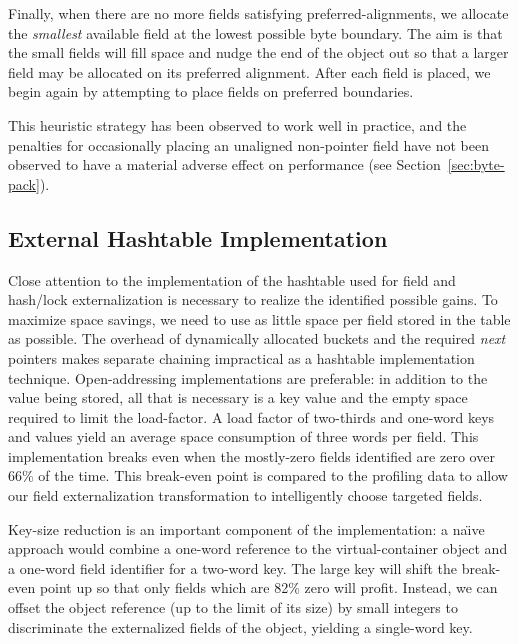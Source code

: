 \documentclass{acmconf}
\begin{document}
Finally, when there are no more fields satisfying
preferred-alignments, we
allocate the {\it smallest} available field at the lowest possible
byte boundary.
The aim is that the small fields will fill space and nudge
the end of the object out so that a larger field may be allocated on
its preferred alignment.  After each field is placed, we begin again
by attempting to place fields on preferred boundaries.

This heuristic strategy has been observed to work well in practice,
and the penalties for occasionally placing an unaligned non-pointer
field have not
been observed to have a material adverse effect on performance (see
Section~\ref{sec:byte-pack}). 



\subsection{External Hashtable Implementation}
\label{sec:extern-impl}

Close attention to the implementation of the hashtable used for
field and hash/lock externalization is
necessary to realize the identified possible gains.  To
maximize space savings, we need to use as little space
per field stored in the table as possible.  The overhead of
dynamically allocated buckets and the required {\it next} pointers
makes separate chaining impractical as a hashtable implementation technique.
Open-addressing
implementations are preferable: in addition to the value being stored,
all that is necessary is a key value and the empty space required to
limit the load-factor.  A load factor of two-thirds and one-word keys
and values yield an average space consumption of three words per
field.  This implementation breaks even when the mostly-zero fields
identified are zero over 66\% of the time.  This break-even point is
compared to the profiling data to allow our field externalization
transformation to intelligently choose targeted fields.

Key-size reduction is an important component of the implementation:
a na{\"\i}ve approach
would combine a one-word reference to the virtual-container object and a
one-word field identifier for a two-word key.  The large key will
shift the break-even point up so that only fields which are 82\% zero
will profit.  Instead, we can offset the
object reference (up to the limit of its size) by small integers
to discriminate the externalized fields of the object, yielding
a single-word key.
\end{document}

